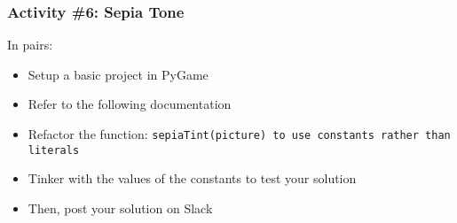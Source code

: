 \begin{frame}
	\frametitle{Activity \#6: Sepia Tone}
	
	In pairs:
	
	\vspace{2em}
	
	\begin{itemize}		
		\item Setup a basic project in PyGame
		\item Refer to the following documentation
		\item Refactor the function: \texttt{sepiaTint(picture) to use constants rather than literals}
		\item Tinker with the values of the constants to test your solution
		\item Then, post your solution on Slack
	\end{itemize}
\end{frame}


